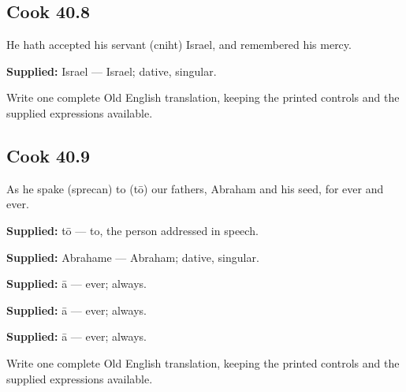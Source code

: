 \par\begin{minipage}{\linewidth}\raggedright
\subsection*{Cook 40.8}

He hath accepted his servant (cniht) Israel, and remembered his mercy.

\textbf{Supplied:} Israel — Israel; dative, singular.

Write one complete Old English translation, keeping the printed controls and the supplied expressions available.

\end{minipage}\par\addvspace{4pt}

\par\begin{minipage}{\linewidth}\raggedright
\subsection*{Cook 40.9}

As he spake (sprecan) to (tō) our fathers, Abraham and his seed, for ever and ever.

\textbf{Supplied:} tō — to, the person addressed in speech.

\end{minipage}\par\addvspace{4pt}

\textbf{Supplied:} Abrahame — Abraham; dative, singular.

\textbf{Supplied:} ā — ever; always.

\textbf{Supplied:} ā — ever; always.

\textbf{Supplied:} ā — ever; always.

Write one complete Old English translation, keeping the printed controls and the supplied expressions available.

